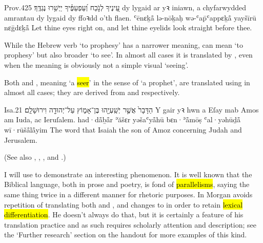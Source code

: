 \begin{example}{Prov.}{4}{25}{}{}
	\quoling
	{עֵ֭ינֶיךָ לְנֹ֣כַח  וְ֝עַפְעַפֶּ֗יךָ יַיְשִׁ֥רוּ נֶגְדֶּֽךָ׃}
	{ dy lygaid ar yꝛ iniawn, a chyfarwydded amrantau dy lygaid dy ffoꝛdd o’th flaen.}
	{ʿēnɛḵå̄ lə-nōḵaḥ  wə-ʿap̄ʿappɛḵå̄ yayšīrū nɛḡdɛḵå̄}
	{Let thine eyes  right on, and let thine eyelids look straight before thee.}
\end{example}




\begin{paper}
	{\click} While the Hebrew verb  ‘to prophesy’ has a narrower meaning,  can mean ‘to prophesy’ but also broader ‘to see’. In almost all cases it is translated by , even when the meaning is obviously not a simple visual ‘seeing’.

	Both  and , meaning ‘a \hl{seer}’ in the sense of ‘a prophet’, are translated using  in almost all cases; they are derived from  and  respectively.
\end{paper}

\begin{example}{Isa.}{2}{1}{}{}
	\quoling
	{הַדָּבָר֙ אֲשֶׁ֣ר 	יְשַֽׁעְיָ֖הוּ בֶּן־אָמ֑וֹץ עַל־יְהוּדָ֖ה וִירוּשָׁלִָֽם׃}
	{Y gair yꝛ hwn a  Eſay mab Amos am Iuda, ac Ieruſalem.}
	{had·då̄ḇå̄r ʾăšɛr  yəšaʿyå̄hū bɛn·ʾå̄mōṣ ʿal·yəhūḏå̄ wī·rūšå̄lå̄yim}
	{The word that Isaiah the son of Amoz  concerning Judah and Jerusalem.}
\end{example}
(See also , , ,  and .)

\begin{paper}
	I will use  to demonstrate an interesting phenomenon. It is well known that the Biblical language, both in prose and poetry, is fond of \hl{parallelisms}, saying the same thing twice in a different manner for rhetoric purposes. In  Morgan avoids repetition of  translating both  and , and changes   to  in order to retain \hl{lexical differentiation}. He doesn’t always do that, but it is certainly a feature of his translation practice and as such requires scholarly attention and description; see the ‘Further research’ section on the handout for more examples of this kind.
\end{paper}

